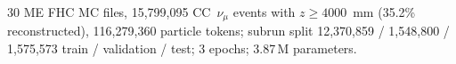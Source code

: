 30 ME FHC MC files, 15{,}799{,}095 CC~$\nu_\mu$ events with $z \ge 4000$~mm (35.2\% reconstructed), 116{,}279{,}360 particle tokens; subrun split 12{,}370{,}859 / 1{,}548{,}800 / 1{,}575{,}573 train / validation / test; 3 epochs; 3.87\,M parameters.
